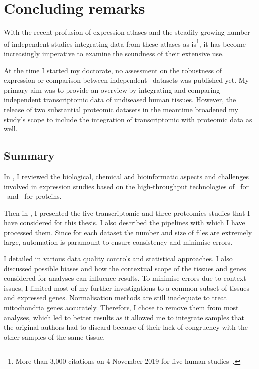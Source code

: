 \chapter{Concluding remarks}\label{ch:conclusion}

\setlength{\epigraphwidth}{0.49\textwidth}%
    \setlength{\epigraphrule}{0pt}%

With the recent profusion of expression atlases
and the steadily growing number of independent studies
integrating data from these atlases as-is\footnote{%
More than 3,000 citations on 4 November 2019 for five human studies~.},
it has become increasingly imperative to examine
the soundness of their extensive use.\mybr\

At the time I started my doctorate,
no assessment on the robustness of expression or
comparison between independent \Rnaseq\ datasets was published yet.
My primary aim was to provide an overview
by integrating and comparing independent transcriptomic data
of undiseased human tissues.
However, the release of two substantial proteomic datasets in the meantime
broadened my study's scope
to include the integration of transcriptomic with proteomic data as well.\mybr\

\section*{Summary}
In ,
I reviewed the biological, chemical and bioinformatic aspects and challenges
involved in expression studies based on the high-throughput technologies
of \Rnaseq\ for \mRNAs\ and \ms\ for proteins.\mybr\

Then in ,
I presented the five transcriptomic and three proteomics studies
that I have considered for this thesis.
I also described the pipelines with which I have processed them.
Since for each dataset the number and size of files are extremely large,
automation is paramount to ensure consistency and minimise errors.\mybr\

I detailed in  various data quality controls
and statistical approaches.
I also discussed possible biases and
how the contextual scope of the tissues and genes considered for analyses
can influence results.
To minimise errors due to context issues,
I limited most of my further investigations to
a common subset of tissues and expressed genes.
Normalisation methods are still inadequate
to treat mitochondria genes accurately.
Therefore, I chose to remove them from most analyses,
which led to better results
as it allowed me to integrate samples
that the original authors had to discard
because of their lack of congruency with the other samples of the same tissue.\mybr\

